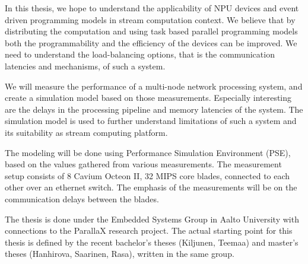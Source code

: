 In this thesis, we hope to understand the applicability of NPU devices and event driven programming models in stream computation context. We believe that by distributing the computation and using task based parallel programming models both the programmability and the efficiency of the devices can be improved. We need to understand the load-balancing options, that is the communication latencies and mechanisms, of such a system.

We will measure the performance of a multi-node network processing system, and create a simulation model based on those measurements. Especially interesting are the delays in the processing pipeline and memory latencies of the system. The simulation model is used to further understand limitations of such a system and its suitability as stream computing platform.

The modeling will be done using Performance Simulation Environment (PSE), based on the values gathered from various measurements. The measurement setup consists of 8 Cavium Octeon II, 32 MIPS core blades, connected to each other over an ethernet switch. The emphasis of the measurements will be on the communication delays between the blades.

The thesis is done under the Embedded Systems Group in Aalto University with connections to the ParallaX research project. The actual starting point for this thesis is defined by the recent bachelor's theses (Kiljunen, Teemaa) and master's theses (Hanhirova, Saarinen, Rasa), written in the same group.

